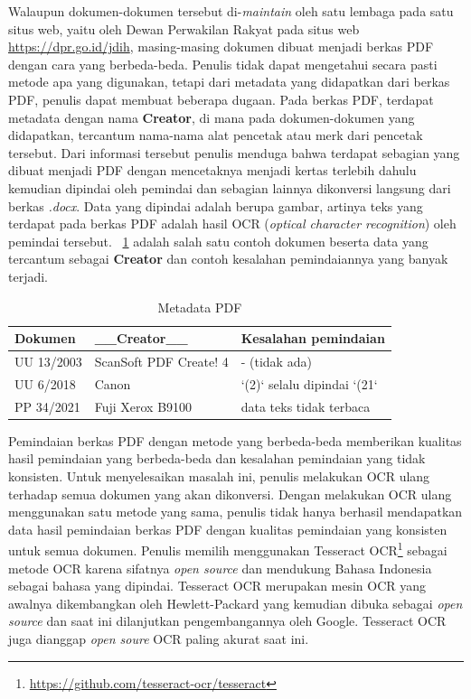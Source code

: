 Walaupun dokumen-dokumen tersebut di-\textit{maintain} oleh satu lembaga pada satu situs web, yaitu oleh Dewan
Perwakilan Rakyat pada situs web \url{https://dpr.go.id/jdih}, masing-masing dokumen dibuat menjadi
berkas PDF dengan cara yang berbeda-beda. Penulis tidak dapat mengetahui secara pasti metode apa
yang digunakan, tetapi dari metadata yang didapatkan dari berkas PDF, penulis dapat membuat beberapa
dugaan. Pada berkas PDF, terdapat metadata dengan nama \textbf{Creator}, di mana pada
dokumen-dokumen \legal yang didapatkan, tercantum nama-nama alat pencetak atau
merk dari pencetak tersebut. Dari informasi tersebut penulis menduga bahwa terdapat sebagian
\legal yang dibuat menjadi PDF dengan mencetaknya menjadi kertas terlebih
dahulu kemudian dipindai oleh pemindai dan sebagian lainnya dikonversi langsung dari berkas
\textit{.docx}. Data yang dipindai adalah berupa gambar, artinya teks yang terdapat pada berkas PDF
adalah hasil OCR (\textit{optical character recognition}) oleh pemindai tersebut.
\tab~\ref{tab:metadata-pdf} adalah salah satu contoh dokumen beserta data yang tercantum sebagai
\textbf{Creator} dan contoh kesalahan pemindaiannya yang banyak terjadi.

\begin{table}
  \centering
  \begin{tabular}{|l|l|l|}
    \hline
    Dokumen    & \_\_Creator\_\_        & Kesalahan pemindaian        \\ \hline \hline
    UU 13/2003 & ScanSoft PDF Create! 4 & - (tidak ada)               \\ \hline
    UU 6/2018  & Canon                  & `(2)` selalu dipindai `(21` \\ \hline
    PP 34/2021 & Fuji Xerox B9100       & data teks tidak terbaca     \\ \hline
  \end{tabular}
  \caption{Metadata PDF \legal}
  \label{tab:metadata-pdf}
\end{table}

Pemindaian berkas PDF dengan metode yang berbeda-beda memberikan kualitas hasil pemindaian yang
berbeda-beda dan kesalahan pemindaian yang tidak konsisten. Untuk menyelesaikan masalah ini, penulis
melakukan OCR ulang terhadap semua dokumen yang akan dikonversi. Dengan melakukan OCR ulang
menggunakan satu metode yang sama, penulis tidak hanya berhasil mendapatkan data hasil pemindaian
berkas PDF dengan kualitas pemindaian yang konsisten untuk semua dokumen. Penulis memilih
menggunakan Tesseract OCR\footnote{\url{https://github.com/tesseract-ocr/tesseract}} sebagai metode
OCR karena sifatnya \textit{open source} dan mendukung Bahasa Indonesia sebagai bahasa yang
dipindai. Tesseract OCR merupakan mesin OCR yang awalnya dikembangkan oleh Hewlett-Packard yang
kemudian dibuka sebagai \textit{open source} dan saat ini dilanjutkan pengembangannya oleh Google.
Tesseract OCR juga dianggap \textit{open soure} OCR paling akurat saat ini.

